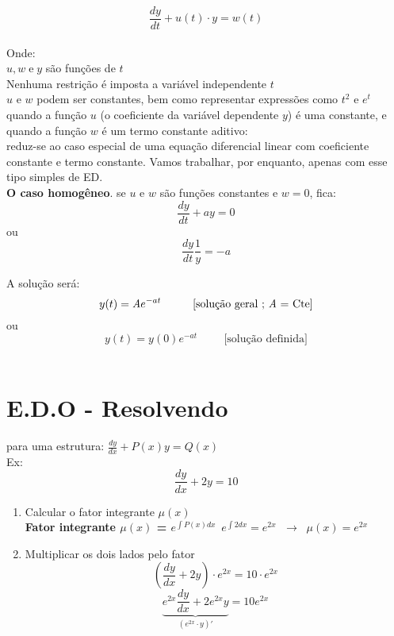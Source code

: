 \documentclass{article}
\begin{document}
{
\[\frac{dy}{dt} + u(t)\cdot y = w(t)\]\\
Onde: \\
$u, w \; \text{e} \;y$ são funções de $t$\\
Nenhuma restrição é imposta a variável independente $t$\\
$u $ e $w$ podem ser constantes, bem como representar expressões  como $t^2$ e $e^t$\\


quando a função $u$ (o coeficiente da variável dependente $y$) é uma constante, e quando a função $w$ é um termo constante aditivo:\\ reduz-se ao caso especial de uma equação diferencial linear com coeficiente constante e termo constante. Vamos trabalhar, por enquanto, apenas com esse tipo simples de ED.\\

\textbf{O caso homogêneo}. se $u$ e $w$ são funções constantes e $w=0$, fica:\\
\[\frac{dy}{dt} + ay = 0\] ou \[\frac{dy}{dt} \frac{1}{y}=-a\]

\newpage
A solução será:
\[y(t)= \textit{A}e^{-at} \hspace{1cm} \text{[solução geral ; \textit{A} = Cte]}\] ou
\[y(t)=y(0)e^{-at} \hspace{1cm} \text{[solução definida]}\]\\
\section{E.D.O - Resolvendo}


para uma estrutura: $\frac{dy}{dx}+P(x)y=Q(x)$
\\

Ex: \[\frac{dy}{dx}+2y=10\]
\begin{enumerate}
    \item Calcular o fator integrante $\mu (x)$\\
    
    \textbf{Fator integrante $\mu (x)$ = {\large$e^{\int P(x)dx\ }$}}\;\;\;\; $e^{\int 2dx}=e^{2x}$ $\; \xrightarrow{}  \;\;\mu(x)= e^{2x} $
    \item Multiplicar os dois lados pelo fator\\
    
    \[\left(\frac{dy}{dx}+2y \right)\cdot e^{2x}=10\cdot e^{2x}\]
    \[\underbrace{e^{2x}\frac{dy}{dx}+2e^{2x}y}_{(e^{2x}\cdot y)'} = 10e^{2x} \]
    

\end{enumerate}}
\end{document}
